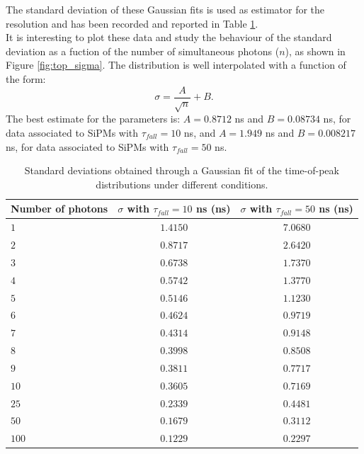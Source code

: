 The standard deviation of these Gaussian fits is used as estimator for the resolution and has been recorded and reported in Table \ref{tab:sigmas}.\\
It is interesting to plot these data and study the behaviour of the standard deviation as a fuction of the number of simultaneous photons ($n$), as shown in Figure \ref{fig:top_sigma}. The distribution is well interpolated with a function of the form:
\begin{equation}
	\sigma = \frac{A}{\sqrt{n}} + B.
\end{equation}
The best estimate for the parameters is: $A = 0.8712$ ns and $B = 0.08734$ ns, for data associated to SiPMs with $\tau_{fall}=10$ ns, and $A = 1.949$ ns and $B = 0.008217$ ns, for data associated to SiPMs with $\tau_{fall}=50$ ns.

\begin{table}
	\centering
	\begin{tabular}{lcc}
		\toprule
		Number of photons	& $\sigma$ with $\tau_{fall}=10$ ns (ns) & $\sigma$ with $\tau_{fall}=50$ ns (ns)	\\
		\midrule
		$1$ 	& $1.4150$ & $7.0680$ \\
		$2$ 	& $0.8717$ & $2.6420$ \\
		$3$ 	& $0.6738$ & $1.7370$ \\
		$4$ 	& $0.5742$ & $1.3770$ \\
		$5$ 	& $0.5146$ & $1.1230$ \\
		$6$ 	& $0.4624$ & $0.9719$ \\
		$7$ 	& $0.4314$ & $0.9148$ \\
		$8$ 	& $0.3998$ & $0.8508$ \\
		$9$ 	& $0.3811$ & $0.7717$ \\
		$10$ 	& $0.3605$ & $0.7169$ \\
		$25$ 	& $0.2339$ & $0.4481$ \\
		$50$ 	& $0.1679$ & $0.3112$ \\
		$100$ 	& $0.1229$ & $0.2297$ \\
		\bottomrule
	\end{tabular}
	\caption{Standard deviations obtained through a Gaussian fit of the time-of-peak distributions under different conditions.}
	\label{tab:sigmas}
\end{table}


